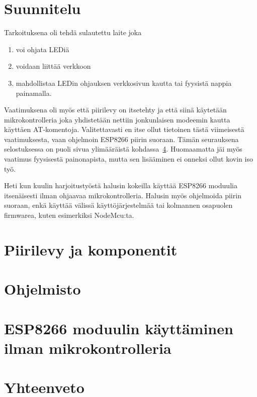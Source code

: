 \section{Suunnitelu}
Tarkoituksena oli tehdä sulautettu laite joka
\begin{enumerate}
\item voi ohjata LEDiä
\item voidaan liittää verkkoon
\item mahdollistaa LEDin ohjauksen verkkosivun kautta tai fyysistä nappia
painamalla.
\end{enumerate}
Vaatimuksena oli myös että piirilevy on itsetehty ja että siinä käytetään
mikrokontrolleria joka yhdistetään nettiin jonkunlaisen modeemin kautta
käyttäen AT-komentoja. Valitettavasti en itse ollut tietoinen tästä viimeisestä
vaatimuksesta, vaan ohjelmoin ESP8266 piirin suoraan. Tämän seurauksena
selostuksessa on puoli sivua ylimääräistä kohdassa~\ref{sec:extra}. Huomaamatta
jäi myös vaatimus fyysisestä painonapista, mutta sen lisääminen ei
onneksi ollut kovin iso työ.

Heti kun kuulin harjoitustyöstä halusin kokeilla käyttää ESP8266 moduulia
itsenäisesti ilman ohjaavaa mikrokontrolleria. Halusin myös ohjelmoida piirin
suoraan, enkä käyttää välissä käyttöjärjestelmää tai kolmannen osapuolen
firmwarea, kuten esimerkiksi NodeMcu:ta.\cite{nodemcu}

\section{Piirilevy ja komponentit}

\section{Ohjelmisto}

\section{ESP8266 moduulin käyttäminen ilman mikrokontrolleria}
\label{sec:extra}

\section{Yhteenveto}
